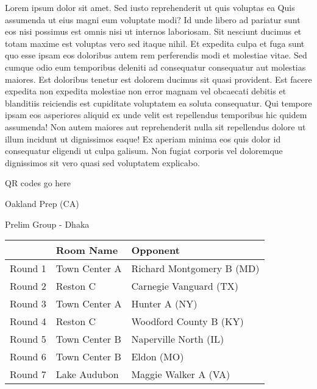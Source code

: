 \documentclass{article}%
\begin{document}
\vspace*{8pt}%
\linebreak%
\newline%
\newline%
Lorem ipsum dolor sit amet. Sed iusto reprehenderit ut quis voluptas ea Quis assumenda ut eius magni eum voluptate modi? Id unde libero ad pariatur sunt eos nisi possimus est omnis nisi ut internos laboriosam. Sit nesciunt ducimus et totam maxime est voluptas vero sed itaque nihil. Et expedita culpa et fuga sunt quo esse ipsam eos doloribus autem rem perferendis modi et molestiae vitae.\newline%
\newline%
Sed cumque odio eum temporibus deleniti ad consequatur consequatur aut molestias maiores. Est doloribus tenetur est dolorem ducimus sit quasi provident. Est facere expedita non expedita molestiae non error magnam vel obcaecati debitis et blanditiis reiciendis est cupiditate voluptatem ea soluta consequatur. Qui tempore ipsam eos asperiores aliquid ex unde velit est repellendus temporibus hic quidem assumenda!\newline%
\newline%
Non autem maiores aut reprehenderit nulla sit repellendus dolore ut illum incidunt ut dignissimos eaque! Ex aperiam minima eos quis dolor id consequatur eligendi ut culpa galisum. Non fugiat corporis vel doloremque dignissimos sit vero quasi sed voluptatem explicabo.\newline%
\newline%
%
\vspace*{30pt}%
\begin{center}%
\begin{Huge}%
QR codes go here%
\end{Huge}%
\end{center}%
\newpage%
%
\begin{center}%
\begin{Huge}%
Oakland Prep (CA)%
\end{Huge}%
\vspace*{8pt}%
\linebreak%
\begin{Large}%
Prelim Group {-} Dhaka%
\end{Large}%
\end{center}%
\begin{tabularx}{\textwidth}{|c|Y|Y|}%
\hline%
&Room Name&Opponent\\%
\hline%
Round 1&Town Center A&Richard Montgomery B (MD)\\%
Round 2&Reston C&Carnegie Vanguard (TX)\\%
Round 3&Town Center A&Hunter A (NY)\\%
Round 4&Reston C&Woodford County B (KY)\\%
Round 5&Town Center B&Naperville North (IL)\\%
Round 6&Town Center B&Eldon (MO)\\%
Round 7&Lake Audubon&Maggie Walker A (VA)\\%
\hline%
\end{tabularx}%
\end{document}
